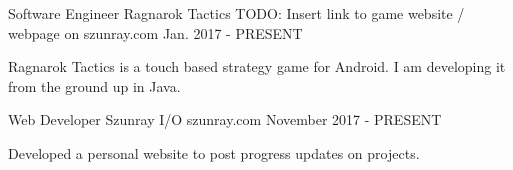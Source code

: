 


\begin{cventries}


\cventry
{Software Engineer} %
{Ragnarok Tactics} %
{TODO: Insert link to game website / webpage on szunray.com} %
{Jan. 2017 - PRESENT} %
{ %
\begin{cvitems}
\item {Ragnarok Tactics is a touch based strategy game for Android. I am developing it from the ground up in Java. }
\end{cvitems}
}

\cventry
{Web Developer} %
{Szunray I/O} %
{szunray.com} %
{November 2017 - PRESENT} %
{ %
\begin{cvitems}
\item {Developed a personal website to post progress updates on projects.} 
\end{cvitems}
}


\end{cventries}
